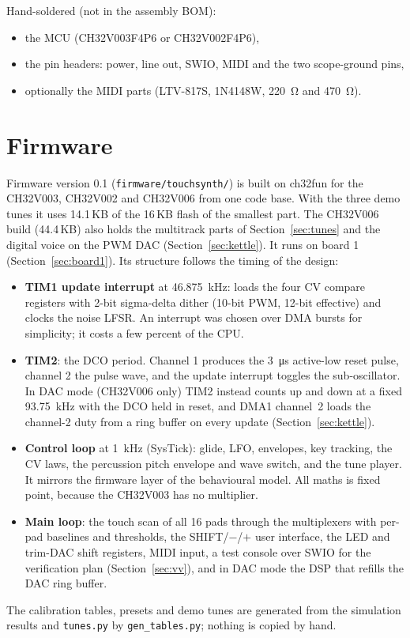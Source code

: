\documentclass[11pt,a4paper]{article}
\newcommand{\file}[1]{\texttt{#1}}
\begin{document}
{\small}

Hand-soldered (not in the assembly BOM):
\begin{itemize}
  \item the MCU (CH32V003F4P6 or CH32V002F4P6),
  \item the pin headers: power, line out, SWIO, MIDI and the two scope-ground pins,
  \item optionally the MIDI parts (LTV-817S, 1N4148W, \SI{220}{\ohm} and \SI{470}{\ohm}).
\end{itemize}

\section{Firmware}
Firmware version 0.1 (\file{firmware/touchsynth/}) is built on ch32fun for the CH32V003, CH32V002 and
CH32V006 from one code base. With the three demo tunes it uses 14.1\,KB of the 16\,KB flash of the smallest
part. The CH32V006 build (44.4\,KB) also holds the multitrack parts of Section~\ref{sec:tunes} and the
digital voice on the PWM DAC (Section~\ref{sec:kettle}). It runs on board 1 (Section~\ref{sec:board1}).
Its structure follows the timing of the design:
\begin{itemize}
  \item \textbf{TIM1 update interrupt} at \SI{46.875}{kHz}: loads the four CV compare registers with 2-bit
    sigma-delta dither (10-bit PWM, 12-bit effective) and clocks the noise LFSR. An interrupt was chosen over
    DMA bursts for simplicity; it costs a few percent of the CPU.
  \item \textbf{TIM2}: the DCO period. Channel 1 produces the \SI{3}{\micro s} active-low reset pulse,
    channel 2 the pulse wave, and the update interrupt toggles the sub-oscillator. In DAC mode (CH32V006
    only) TIM2 instead counts up and down at a fixed \SI{93.75}{kHz} with the DCO held in reset, and DMA1
    channel~2 loads the channel-2 duty from a ring buffer on every update (Section~\ref{sec:kettle}).
  \item \textbf{Control loop} at \SI{1}{kHz} (SysTick): glide, LFO, envelopes, key tracking, the CV laws,
    the percussion pitch envelope and wave switch, and the tune player. It mirrors the firmware layer of the behavioural model. All maths is fixed
    point, because the CH32V003 has no multiplier.
  \item \textbf{Main loop}: the touch scan of all 16 pads through the multiplexers with per-pad baselines
    and thresholds, the SHIFT/$-$/$+$ user interface, the LED and trim-DAC shift registers, MIDI input, a
    test console over SWIO for the verification plan (Section~\ref{sec:vv}), and in DAC mode the DSP that
    refills the DAC ring buffer.
\end{itemize}
The calibration tables, presets and demo tunes are generated from the simulation results and
\file{tunes.py} by \file{gen\_tables.py}; nothing is copied by hand.
\end{document}
